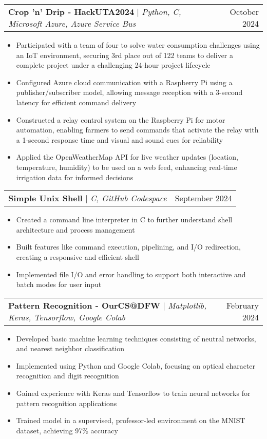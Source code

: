 \documentclass[letterpaper,11pt]{article}
\makeatletter
\newcommand{\resumeItem}[1]{
  \item\small{
    {#1 \vspace{-2pt}}
  }
}
\newcommand{\resumeProjectHeading}[2]{
    \item
    \begin{tabular*}{0.97\textwidth}{l@{\extracolsep{\fill}}r}
      \small#1 & #2 \\
    \end{tabular*}\vspace{-7pt}
}
\newcommand{\resumeItemListStart}{\begin{itemize}}
\newcommand{\resumeItemListEnd}{\end{itemize}\vspace{-5pt}}
\makeatother
\begin{document}
      \resumeProjectHeading
          {\textbf{Crop 'n' Drip - HackUTA2024} $|$ \emph{Python, C, Microsoft Azure, Azure Service Bus}}{October 2024}
          \resumeItemListStart
            \resumeItem{Participated with a team of four to solve water consumption challenges using an IoT environment, securing 3rd place out of 122 teams to deliver a complete project under a challenging 24-hour project lifecycle}
            \resumeItem{Configured Azure cloud communication with a Raspberry Pi using a publisher/subscriber model, allowing message reception with a 3-second latency for efficient command delivery}
            \resumeItem{Constructed a relay control system on the Raspberry Pi for motor automation, enabling farmers to send commands that activate the relay with a 1-second response time and visual and sound cues for reliability}
            \resumeItem{Applied the OpenWeatherMap API for live weather updates (location, temperature, humidity) to be used on a web feed, enhancing real-time irrigation data for informed decisions}
          \resumeItemListEnd

      \resumeProjectHeading
          {\textbf{Simple Unix Shell} $|$ \emph{C, GitHub Codespace}}{September 2024}
          \resumeItemListStart
            \resumeItem{Created a command line interpreter in C to further understand shell architecture and process management}
            \resumeItem{Built features like command execution, pipelining, and I/O redirection, creating a responsive and efficient shell}
            \resumeItem{Implemented file I/O and error handling to support both interactive and batch modes for user input}
          \resumeItemListEnd

      \resumeProjectHeading
          {\textbf{Pattern Recognition - OurCS@DFW} $|$ \emph{Matplotlib, Keras, Tensorflow, Google Colab}}{February 2024}
          \resumeItemListStart
            \resumeItem{Developed basic machine learning techniques consisting of neutral networks, and nearest neighbor classification}
            \resumeItem{Implemented using Python and Google Colab, focusing on optical character recognition and digit recognition}
            \resumeItem{Gained experience with Keras and Tensorflow to train neural networks for pattern recognition applications}
            \resumeItem{Trained model in a supervised, professor-led environment on the MNIST dataset, achieving 97\% accuracy}
          \resumeItemListEnd
\end{document}
